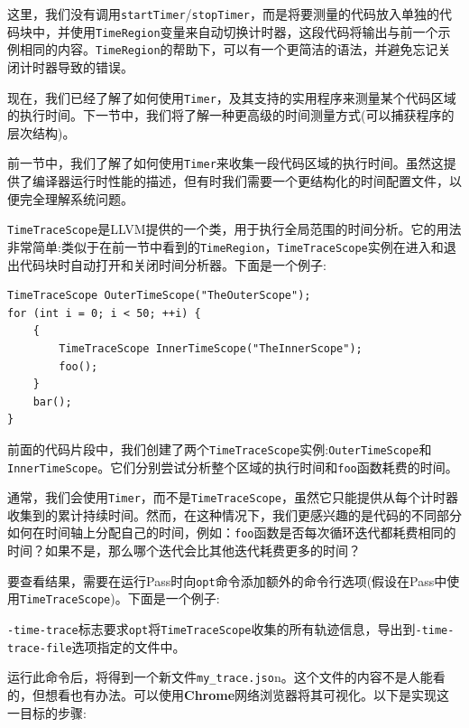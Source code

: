 这里，我们没有调用\texttt{startTimer}/\texttt{stopTimer}，而是将要测量的代码放入单独的代码块中，并使用\texttt{TimeRegion}变量来自动切换计时器，这段代码将输出与前一个示例相同的内容。\texttt{TimeRegion}的帮助下，可以有一个更简洁的语法，并避免忘记关闭计时器导致的错误。

现在，我们已经了解了如何使用\texttt{Timer}，及其支持的实用程序来测量某个代码区域的执行时间。下一节中，我们将了解一种更高级的时间测量方式(可以捕获程序的层次结构)。



前一节中，我们了解了如何使用\texttt{Timer}来收集一段代码区域的执行时间。虽然这提供了编译器运行时性能的描述，但有时我们需要一个更结构化的时间配置文件，以便完全理解系统问题。

\texttt{TimeTraceScope}是LLVM提供的一个类，用于执行全局范围的时间分析。它的用法非常简单:类似于在前一节中看到的\texttt{TimeRegion}，\texttt{TimeTraceScope}实例在进入和退出代码块时自动打开和关闭时间分析器。下面是一个例子:

\begin{lstlisting}[style=styleCXX]
TimeTraceScope OuterTimeScope("TheOuterScope");
for (int i = 0; i < 50; ++i) {
	{
		TimeTraceScope InnerTimeScope("TheInnerScope");
		foo();
	}
	bar();
}
\end{lstlisting}

前面的代码片段中，我们创建了两个\texttt{TimeTraceScope}实例:\texttt{OuterTimeScope}和\texttt{InnerTimeScope}。它们分别尝试分析整个区域的执行时间和\texttt{foo}函数耗费的时间。

通常，我们会使用\texttt{Timer}，而不是\texttt{TimeTraceScope}，虽然它只能提供从每个计时器收集到的累计持续时间。然而，在这种情况下，我们更感兴趣的是代码的不同部分如何在时间轴上分配自己的时间，例如：\texttt{foo}函数是否每次循环迭代都耗费相同的时间？如果不是，那么哪个迭代会比其他迭代耗费更多的时间？

要查看结果，需要在运行Pass时向\texttt{opt}命令添加额外的命令行选项(假设在Pass中使用\texttt{TimeTraceScope})。下面是一个例子:


\texttt{-time-trace}标志要求\texttt{opt}将\texttt{TimeTraceScope}收集的所有轨迹信息，导出到\texttt{-time-trace-file}选项指定的文件中。

运行此命令后，将得到一个新文件\texttt{my\_trace.jso}n。这个文件的内容不是人能看的，但想看也有办法。可以使用\textbf{Chrome}网络浏览器将其可视化。以下是实现这一目标的步骤:


